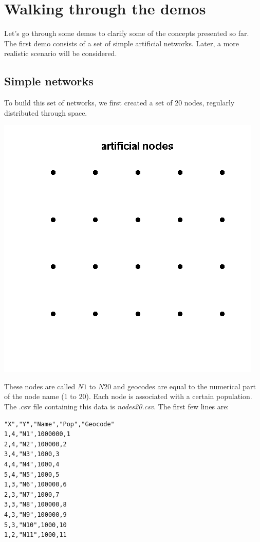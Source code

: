 \chapter{Walking through the demos}
\label{ch:demos}

Let's go through some demos to clarify some of the concepts presented so far. The first demo consists of a set of simple artificial networks. Later, a more realistic scenario will be considered.

\section{Simple networks}

To build this set of networks, we first created a set of 20 nodes, regularly distributed through space.
 \begin{center}
\includegraphics[scale=0.4]{nos.png}
\label{fig:nos}
\end{center}

These nodes are called $N1$ to $N20$ and geocodes are equal to the numerical part of the node  name ($1$ to $20$). Each node is associated with a certain population. The .csv file containing this data is \textit{nodes20.csv}. The first few lines are:

\begin{verbatim}
"X","Y","Name","Pop","Geocode"
1,4,"N1",1000000,1
2,4,"N2",100000,2
3,4,"N3",1000,3
4,4,"N4",1000,4
5,4,"N5",1000,5
1,3,"N6",100000,6
2,3,"N7",1000,7
3,3,"N8",100000,8
4,3,"N9",100000,9
5,3,"N10",1000,10
1,2,"N11",1000,11
\end{verbatim}


